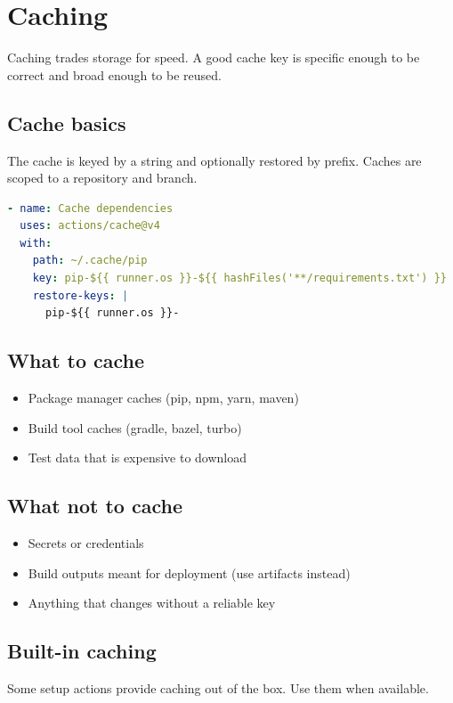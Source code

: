 \chapter{Caching}

Caching trades storage for speed.
A good cache key is specific enough to be correct and broad enough to be reused.

\section{Cache basics}
The cache is keyed by a string and optionally restored by prefix.
Caches are scoped to a repository and branch.

\begin{lstlisting}[language=YAML]
- name: Cache dependencies
  uses: actions/cache@v4
  with:
    path: ~/.cache/pip
    key: pip-${{ runner.os }}-${{ hashFiles('**/requirements.txt') }}
    restore-keys: |
      pip-${{ runner.os }}-
\end{lstlisting}

\section{What to cache}
\begin{itemize}[nosep]
  \item Package manager caches (pip, npm, yarn, maven)
  \item Build tool caches (gradle, bazel, turbo)
  \item Test data that is expensive to download
\end{itemize}

\section{What not to cache}
\begin{itemize}[nosep]
  \item Secrets or credentials
  \item Build outputs meant for deployment (use artifacts instead)
  \item Anything that changes without a reliable key
\end{itemize}

\section{Built-in caching}
Some setup actions provide caching out of the box.
Use them when available.

